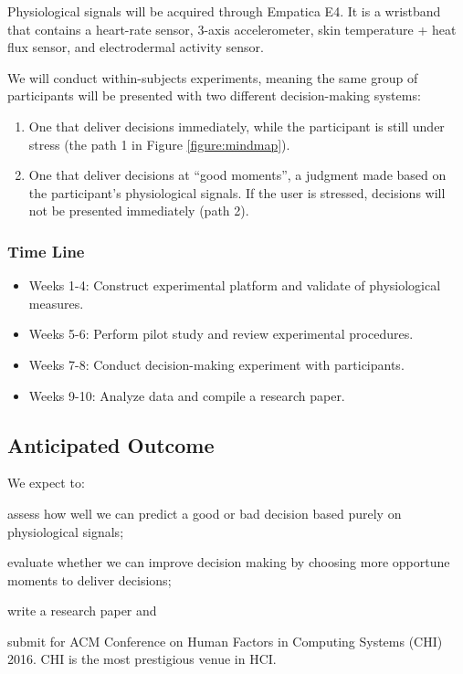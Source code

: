 \documentclass[12pt]{article}
\begin{document}
Physiological signals will be acquired through Empatica E4. It is a wristband that contains a heart-rate sensor, 3-axis accelerometer, skin temperature + heat flux sensor, and electrodermal activity sensor.


We will conduct within-subjects experiments, meaning the same group of participants will be presented with two different decision-making systems:
\begin{enumerate}
\itemsep1pt\parskip0pt
\item One that deliver decisions immediately, while the participant is still under stress (the path 1 in Figure \ref{figure:mindmap}). 
\item One that deliver decisions at ``good moments'', a judgment made based on the participant's physiological signals. If the user is stressed, decisions will not be presented immediately (path 2).
\end{enumerate}



\subsubsection{Time Line}\label{timeline}
\begin{itemize} 
\itemsep0pt\parskip0pt
\item Weeks 1-4: Construct experimental platform and validate of physiological measures.
\item Weeks 5-6: Perform pilot study and review experimental procedures.
\item Weeks 7-8: Conduct decision-making experiment with participants.
\item Weeks 9-10: Analyze data and compile a research paper.
\end{itemize}


\subsection{Anticipated Outcome}\label{anticipated-outcome}
We expect to:
\begin{inparaenum}[\itshape 1\upshape)]
\item
  assess how well we can predict a good or bad decision based purely on physiological signals;
\item 
  evaluate whether we can improve decision making by choosing more opportune moments to deliver decisions;
\item
  write a research paper and
\item
  submit for ACM Conference on Human Factors in Computing Systems (CHI) 2016. CHI is the most prestigious venue in HCI.
\end{inparaenum}
\end{document}
